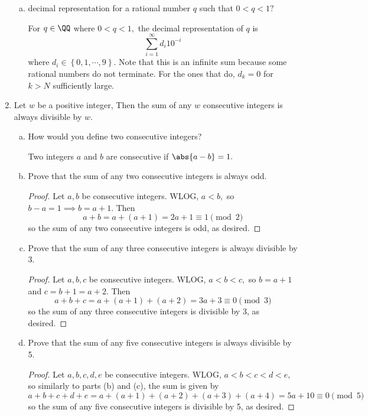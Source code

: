 \documentclass{article}
\begin{document}
\begin{enumerate}
\begin{enumerate}[(a)]
			\item decimal representation for a rational number $q$ such that $0<q<1?$
				\begin{definition*}
					For $q\in\QQ$ where $0<q<1,$ the decimal representation of $q$ is
					\[\sum_{i=1}^{\infty}d_i 10^{-i}\]
					where $d_i\in\left\{ 0, 1, \cdots, 9 \right\}.$ Note that this is an infinite sum because some rational numbers do not terminate. For the ones that do, $d_k=0$ for $k>N$ sufficiently large. 
				\end{definition*}
				
		\end{enumerate}

	\item Let $w$ be a positive integer, Then the sum of any $w$ consecutive integers is always divisible by $w.$

		\begin{enumerate}[(a)]
			\item How would you define two consecutive integers?
				\begin{answer*}
					Two integers $a$ and $b$ are consecutive if $\abs{a-b}=1.$
				\end{answer*}

			\item Prove that the sum of any two consecutive integers is always odd.
				\begin{proof}
					Let $a, b$ be consecutive integers. WLOG, $a<b,$ so $b-a=1\implies b=a+1.$ Then 
					\[a+b=a+(a+1)=2a+1\equiv1\pmod 2\]
					so the sum of any two consecutive integers is odd, as desired.
				\end{proof}
				
			\item Prove that the sum of any three consecutive integers is always divisible by 3.
				\begin{proof}
					Let $a, b, c$ be consecutive integers. WLOG, $a<b<c,$ so $b=a+1$ and $c=b+1=a+2.$ Then
					\[a+b+c=a+(a+1)+(a+2)=3a+3\equiv0\pmod 3\]
					so the sum of any three consecutive integers is divisible by 3, as desired.
				\end{proof}

				\newpage
			\item Prove that the sum of any five consecutive integers is always divisible by 5.
				\begin{proof}
					Let $a, b, c, d, e$ be consecutive integers. WLOG, $a<b<c<d<e,$ so similarly to parts (b) and (c), the sum is given by
					\[a+b+c+d+e=a+(a+1)+(a+2)+(a+3)+(a+4)=5a+10\equiv0\pmod 5\]
					so the sum of any five consecutive integers is divisible by 5, as desired.
				\end{proof}


\end{enumerate}
\end{enumerate}
\end{document}
